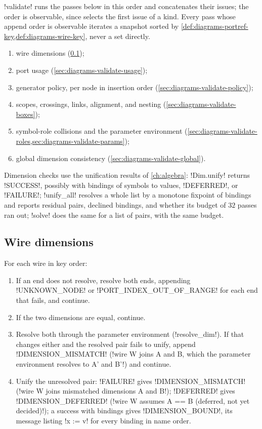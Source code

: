 \py!validate! runs the passes below in this order and concatenates their issues; the order is observable, since  selects the first issue of a kind. Every pass whose append order is observable iterates a snapshot sorted by \cref{def:diagrams-portref-key,def:diagrams-wire-key}, never a set directly.
\begin{enumerate}
\item wire dimensions (\cref{sec:diagrams-validate-wires});
\item port usage (\cref{sec:diagrams-validate-usage});
\item generator policy, per node in insertion order (\cref{sec:diagrams-validate-policy});
\item \bbox{} scopes, crossings, links, alignment, and nesting (\cref{sec:diagrams-validate-boxes});
\item symbol-role collisions and the parameter environment (\cref{sec:diagrams-validate-roles,sec:diagrams-validate-params});
\item global dimension consistency (\cref{sec:diagrams-validate-global}).
\end{enumerate}

Dimension checks use the unification results of \cref{ch:algebra}: \py!Dim.unify! returns \code!SUCCESS!, possibly with bindings of symbols to values, \code!DEFERRED!, or \code!FAILURE!; \py!unify_all! resolves a whole list by a monotone fixpoint of bindings and reports residual pairs, declined bindings, and whether its budget of $32$ passes ran out; \py!solve! does the same for a list of pairs, with the same budget.

\subsection{Wire dimensions}\label{sec:diagrams-validate-wires}

For each wire in key order:
\begin{enumerate}
\item If an end does not resolve, resolve both ends, appending \code!UNKNOWN_NODE! or \code!PORT_INDEX_OUT_OF_RANGE! for each end that fails, and continue.
\item If the two dimensions are equal, continue.
\item Resolve both through the parameter environment (\py!resolve_dim!). If that changes either and the resolved pair fails to unify, append \code!DIMENSION_MISMATCH! (\code!wire W joins A and B, which the parameter environment resolves to A' and B'!) and continue.
\item Unify the unresolved pair: \code!FAILURE! gives \code!DIMENSION_MISMATCH! (\code!wire W joins mismatched dimensions A and B!); \code!DEFERRED! gives \code!DIMENSION_DEFERRED! (\code!wire W assumes A == B (deferred, not yet decided)!); a success with bindings gives \code!DIMENSION_BOUND!, its message listing \code!x := v! for every binding in name order.
\end{enumerate}

